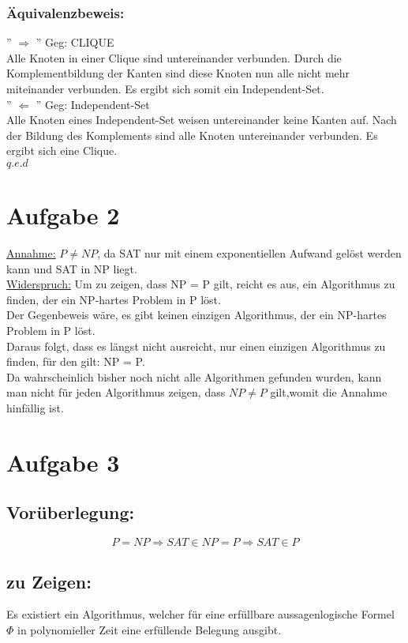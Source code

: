 \documentclass[a4paper,11pt,twoside]{article}
\begin{document}
 \subsubsection*{Äquivalenzbeweis:} 
'' $\Rightarrow$ ''
Geg: CLIQUE\\
Alle Knoten in einer Clique sind untereinander verbunden. Durch die Komplementbildung der Kanten sind diese Knoten nun alle nicht mehr miteinander verbunden. Es ergibt sich somit ein Independent-Set. \\

'' $\Leftarrow$ ''
Geg: Independent-Set\\
Alle Knoten eines Independent-Set weisen untereinander keine Kanten auf. Nach der Bildung des Komplements sind alle Knoten untereinander verbunden. Es ergibt sich eine Clique. \\

$q.e.d$


\section*{Aufgabe 2}
\underline{Annahme:}  $P \neq NP$, da SAT nur mit einem exponentiellen Aufwand gelöst werden kann und SAT in NP liegt.\\
\underline {Widerspruch:} Um zu zeigen, dass NP = P gilt, reicht es aus, ein Algorithmus zu finden, der ein NP-hartes Problem in P löst.\\
Der Gegenbeweis wäre, es gibt keinen einzigen Algorithmus, der ein NP-hartes Problem in P löst. \\
Daraus folgt, dass es längst nicht ausreicht, nur einen einzigen Algorithmus zu finden, für den gilt: NP = P.\\
Da wahrscheinlich bisher noch nicht alle Algorithmen gefunden wurden, kann man nicht für jeden Algorithmus zeigen, dass $NP \neq P$ gilt,womit  die Annahme hinfällig ist.


\pagebreak
\section*{Aufgabe 3}
\subsection*{Vorüberlegung:}
\[P=NP \Rightarrow SAT\in NP=P\Rightarrow SAT\in P\]
\subsection*{zu Zeigen:}
Es existiert ein Algorithmus, welcher für eine erfüllbare aussagenlogische Formel $\Phi$ in polynomieller Zeit eine erfüllende Belegung ausgibt.\\
\end{document}
